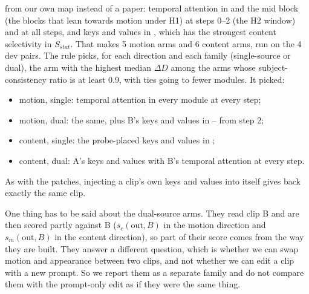 \documentclass[twoside,english]{article}
\newcommand{\dD}{\Delta D}
\begin{document}
from our own map instead of a paper: temporal attention in  and the mid block (the
blocks that lean towards motion under H1) at steps 0--2 (the H2 window) and at all steps, and keys and
values in , which has the strongest content selectivity in $S_{stat}$. That makes
5 motion arms and 6 content arms, run on the 4 dev pairs. The rule picks, for each direction and each
family (single-source or dual), the arm with the highest median $\dD$ among the arms whose
subject-consistency ratio is at least 0.9, with ties going to fewer modules. It picked:
\begin{itemize}
\item motion, single: temporal attention in every module at every step;
\item motion, dual: the same, plus B's keys and values in -- from step 2;
\item content, single: the probe-placed keys and values in ;
\item content, dual: A's keys and values with B's temporal attention at every step.
\end{itemize}
As with the patches, injecting a clip's own keys and values into itself gives back exactly the same clip.

One thing has to be said about the dual-source arms. They read clip B and are then scored partly
against B ($s_c(\text{out},B)$ in the motion direction and $s_m(\text{out},B)$ in the content
direction), so part of their score comes from the way they are built. They answer a different
question, which is whether we can swap motion and appearance between two clips, and not whether we
can edit a clip with a new prompt. So we report them as a separate family and do not compare them
with the prompt-only edit as if they were the same thing.
\end{document}
